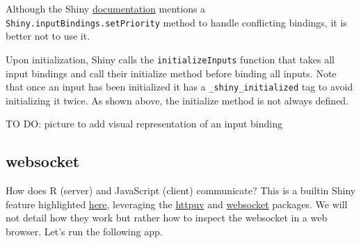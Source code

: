 \documentclass[]{book}
\newenvironment{Shaded}{\begin{snugshade}}{\end{snugshade}}
\newcommand{\ControlFlowTok}[1]{\textcolor[rgb]{0.13,0.29,0.53}{\textbf{#1}}}
\newcommand{\DataTypeTok}[1]{\textcolor[rgb]{0.13,0.29,0.53}{#1}}
\newcommand{\KeywordTok}[1]{\textcolor[rgb]{0.13,0.29,0.53}{\textbf{#1}}}
\newcommand{\NormalTok}[1]{#1}
\newcommand{\OperatorTok}[1]{\textcolor[rgb]{0.81,0.36,0.00}{\textbf{#1}}}
\newcommand{\OtherTok}[1]{\textcolor[rgb]{0.56,0.35,0.01}{#1}}
\newcommand{\StringTok}[1]{\textcolor[rgb]{0.31,0.60,0.02}{#1}}
\begin{document}
Although the Shiny \href{https://shiny.rstudio.com/articles/building-inputs.html}{documentation} mentions a \texttt{Shiny.inputBindings.setPriority} method to handle conflicting bindings, it is better not to use it.

Upon initialization, Shiny calls the \texttt{initializeInputs} function that takes all input bindings and call their initialize method before binding all inputs. Note that once an input has been initialized it has a \texttt{\_shiny\_initialized} tag to avoid initializing it twice. As shown above, the initialize method is not always defined.

TO DO: picture to add visual representation of an input binding

\hypertarget{websocket}{%
\subsection{websocket}\label{websocket}}

How does R (server) and JavaScript (client) communicate? This is a builtin Shiny feature highlighted \href{Fast\%20bidirectional\%20communication\%20between\%20the\%20web\%20browser\%20and\%20R\%20using\%20the\%20httpuv\%20package.}{here}, leveraging the \href{https://github.com/rstudio/httpuv}{httpuv} and \href{https://github.com/rstudio/websocket}{websocket} packages. We will not detail how they work but rather how to inspect the websocket in a web browser. Let's run the following app.

\begin{Shaded}
\end{Shaded}
\end{document}
